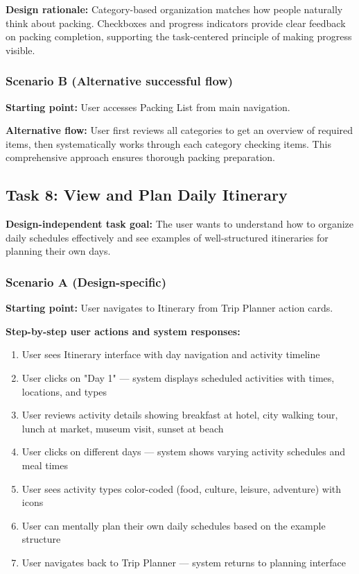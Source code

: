 \documentclass[11pt,a4paper]{article}
\begin{document}
\textbf{Design rationale:} Category-based organization matches how people naturally think about packing. Checkboxes and progress indicators provide clear feedback on packing completion, supporting the task-centered principle of making progress visible.

\subsubsection*{Scenario B (Alternative successful flow)}

\textbf{Starting point:} User accesses Packing List from main navigation.

\textbf{Alternative flow:} User first reviews all categories to get an overview of required items, then systematically works through each category checking items. This comprehensive approach ensures thorough packing preparation.

\subsection*{Task 8: View and Plan Daily Itinerary}

\textbf{Design-independent task goal:}
The user wants to understand how to organize daily schedules effectively and see examples of well-structured itineraries for planning their own days.

\subsubsection*{Scenario A (Design-specific)}

\textbf{Starting point:} User navigates to Itinerary from Trip Planner action cards.

\textbf{Step-by-step user actions and system responses:}
\begin{enumerate}
\item User sees Itinerary interface with day navigation and activity timeline
\item User clicks on "Day 1" — system displays scheduled activities with times, locations, and types
\item User reviews activity details showing breakfast at hotel, city walking tour, lunch at market, museum visit, sunset at beach
\item User clicks on different days — system shows varying activity schedules and meal times
\item User sees activity types color-coded (food, culture, leisure, adventure) with icons
\item User can mentally plan their own daily schedules based on the example structure
\item User navigates back to Trip Planner — system returns to planning interface
\end{enumerate}
\end{document}
